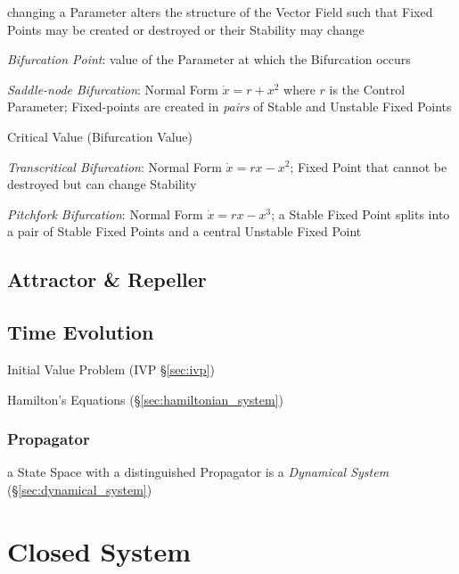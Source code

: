 changing a Parameter alters the structure of the Vector Field such that Fixed
Points may be created or destroyed or their Stability may change

\emph{Bifurcation Point}: value of the Parameter at which the Bifurcation
occurs

\emph{Saddle-node Bifurcation}: Normal Form $\dot{x} = r + x^2$ where $r$ is
the Control Parameter;
Fixed-points are created in \emph{pairs} of Stable and Unstable Fixed Points


Critical Value (Bifurcation Value)

\emph{Transcritical Bifurcation}: Normal Form $\dot{x} = rx - x^2$; Fixed Point
that cannot be destroyed but can change Stability

\emph{Pitchfork Bifurcation}: Normal Form $\dot{x} = rx - x^3$; a Stable Fixed
Point splits into a pair of Stable Fixed Points and a central Unstable Fixed
Point



\subsection{Attractor \& Repeller}\label{sec:attractor_repeller}

\subsection{Time Evolution}\label{sec:time_evolution}

\fist Initial Value Problem (IVP \S\ref{sec:ivp})

Hamilton's Equations (\S\ref{sec:hamiltonian_system})



\subsubsection{Propagator}\label{sec:propagator}

a State Space with a distinguished Propagator is a \emph{Dynamical System}
(\S\ref{sec:dynamical_system})



\section{Closed System}\label{sec:closed_system}

